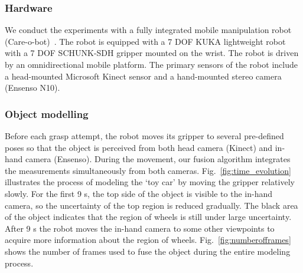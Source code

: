 \subsubsection{Hardware}
We conduct the experiments with a fully integrated mobile manipulation robot (Care-o-bot)~\cite{careobot}. The robot is equipped with a 7 DOF KUKA lightweight robot with a 7 DOF SCHUNK-SDH gripper mounted on the wrist. The robot is driven by an omnidirectional mobile platform. The primary sensors of the robot include a head-mounted Microsoft Kinect sensor and a hand-mounted stereo camera (Ensenso N10). 

\subsubsection{Object modelling}
Before each grasp attempt, the robot moves its gripper to several pre-defined poses so that the object is perceived from both head camera (Kinect) and in-hand camera (Ensenso). During the movement, our fusion algorithm integrates the measurements simultaneously from both cameras. Fig.~\ref{fig:time_evolution} illustrates the process of modeling the `toy car' by moving the gripper relatively slowly. For the first 9 s, the top side of the object is visible to the in-hand camera, so the uncertainty of the top region is reduced gradually. The black area of the object indicates that the region of wheels is still under large uncertainty. After 9 s the robot moves the in-hand camera to some other viewpoints to acquire more information about the region of wheels. Fig.~\ref{fig:numberofframes} shows the number of frames used to fuse the object during the entire modeling process.  


